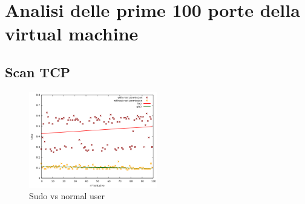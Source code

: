 \documentclass{article}
\begin{document}
\section{Analisi delle prime 100 porte della virtual machine}
\subsection{Scan TCP}

\begin{figure} %
  \centering
  \includegraphics[width=0.5\textwidth]{sudo_vs_user_def.png}
  \caption{Sudo vs normal user}\label{Fig:sudovsuser}
\end{figure}
\end{document}

